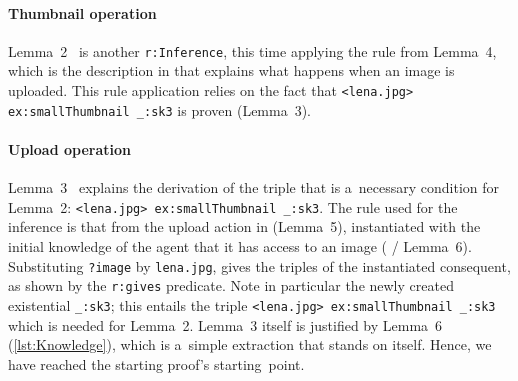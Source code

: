 \paragraph{\bfseries Thumbnail operation}
Lemma~2~ is another \verb!r:Inference!,
this time applying the rule from Lemma~4,
which is the \restdesc description in 
that explains what happens when an image is uploaded. 
This rule application relies on the fact that %
\verb!<lena.jpg> ex:smallThumbnail _:sk3! is proven (Lemma~3). 

\vspace{-1em}

\paragraph{\bfseries Upload operation}
Lemma~3~ explains the derivation of the triple
that is a~necessary condition for Lemma~2:
\verb!<lena.jpg> ex:smallThumbnail _:sk3!.
The rule used for the inference is that
from the upload action in  (Lemma~5),
instantiated with the initial knowledge of the agent
that it has access to an image ( / Lemma~6).
Substituting %
\verb!?image! %
 by \verb!lena.jpg!,
gives the triples of the instantiated consequent,
as shown by the \verb!r:gives! predicate.
Note in particular the newly created existential \verb!_:sk3!;
this entails the triple \verb!<lena.jpg> ex:smallThumbnail _:sk3!
which is needed for Lemma~2.
Lemma~3 itself is justified by Lemma~6 (\cref{lst:Knowledge}),
which is a~simple extraction that stands on itself.
Hence, we have reached the starting proof's starting~point.

\vspace{-1em}

